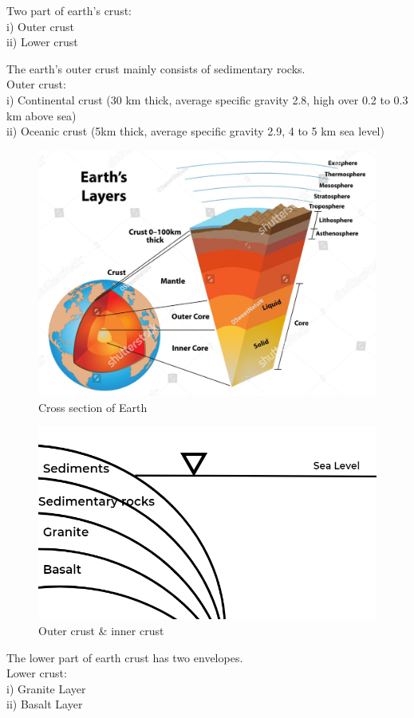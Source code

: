 \documentclass{article}
\begin{document}
Two part of earth's crust:\\
i) Outer crust \\
ii) Lower crust 

\vspace*{0.5cm}
The earth's outer crust mainly consists of sedimentary rocks. \\
Outer crust:\\
i) Continental crust (30 km thick, average specific gravity 2.8, high over 0.2 to 0.3 km above sea)\\
ii) Oceanic crust (5km thick, average specific gravity 2.9, 4 to 5 km sea level)

\begin{figure}[h]
  \begin{center}
    \includegraphics*[width=0.6\linewidth]{img/cross_section_earth.jpg}
    \caption{Cross section of Earth}
  \end{center}
\end{figure}
\begin{figure}[h]
  \begin{center}
    \includegraphics*[width=0.6\linewidth]{img/Crust.png}
    \caption{Outer crust \& inner crust} 
  \end{center}
\end{figure}

\vspace*{0.5cm}
The lower part of earth crust has two envelopes. \\
Lower crust: \\
i) Granite Layer \\
ii) Basalt Layer \\
\end{document}
